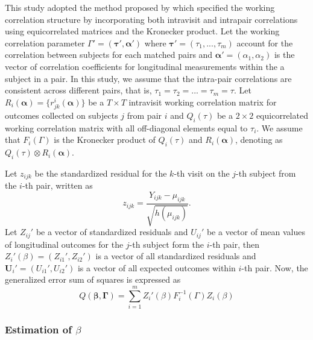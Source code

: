 \documentclass[
]{aft}
\begin{document}
This study adopted the method proposed by \citet{Shults2002} which
specified the working correlation structure by incorporating both
intravisit and intrapair correlations using equicorrelated matrices and
the Kronecker product. Let the working correlation parameter
\(\Gamma' = (\boldsymbol{\tau}', \boldsymbol{\alpha}')\) where
\(\boldsymbol{\tau}' = (\tau_1, ..., \tau_m)\) account for the
correlation between subjects for each matched pairs and
\(\boldsymbol{\alpha}' = (\alpha_1, \alpha_2)\) is the vector of
correlation coefficients for longitudinal measurements within the a
subject in a pair. In this study, we assume that the intra-pair
correlations are consistent across different pairs, that is,
\(\tau_1 = \tau_2 = ... = \tau_m = \tau\). Let
\(R_i(\boldsymbol{\alpha}) = \{r^i_{jk}(\boldsymbol{\alpha})\}\) be a
\(T \times T\) intravisit working correlation matrix for outcomes
collected on subjects \(j\) from pair \(i\) and \(Q_i(\tau)\) be a
\(2 \times 2\) equicorrelated working correlation matrix with all
off-diagonal elements equal to \(\tau_i\). We assume that
\(F_i(\Gamma)\) is the Kronecker product of \(Q_i(\tau)\) and
\(R_i(\boldsymbol{\alpha})\), denoting as
\(Q_i(\tau)\otimes R_i(\boldsymbol{\alpha})\).

Let \(z_{ijk}\) be the standardized residual for the \(k\)-th visit on
the \(j\)-th subject from the \(i\)-th pair, written as \[
z_{ijk} = \frac{Y_{ijk} - \mu_{ijk}}{\sqrt{h(\mu_{ijk})}}.
\] Let \(Z_{ij}'\) be a vector of standardized residuals and \(U_{ij}'\)
be a vector of mean values of longitudinal outcomes for the \(j\)-th
subject form the \(i\)-th pair, then
\(Z_i'(\beta) = (Z_{i1}', Z_{i2}')\) is a vector of all standardized
residuals and \(\boldsymbol{U}_i' = (U_{i1}', U_{i2}')\) is a vector of
all expected outcomes within \(i\)-th pair. Now, the generalized error
sum of squares is expressed as \[
Q(\boldsymbol{\beta}, \boldsymbol{\Gamma}) = \sum_{i=1}^m Z_i'(\beta)F_i^{-1}(\Gamma) Z_i(\beta)
\]

\subsubsection{\texorpdfstring{Estimation of
\(\beta\)}{Estimation of \textbackslash beta}}\label{estimation-of-beta}
\end{document}
